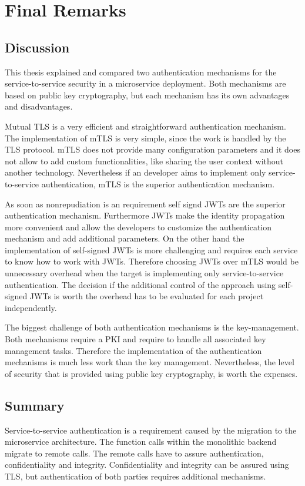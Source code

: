 \chapter{Final Remarks}
\label{cha:final_remarks}

\section{Discussion}
This thesis explained and compared two authentication mechanisms for the service-to-service security in a microservice deployment.
Both mechanisms are based on public key cryptography, but each mechanism has its own advantages and disadvantages.

Mutual TLS is a very efficient and straightforward authentication mechanism.
The implementation of mTLS is very simple, since the work is handled by the TLS protocol.
mTLS does not provide many configuration parameters and it does not allow to add custom functionalities, like sharing the user context without another technology.
Nevertheless if an developer aims to implement only service-to-service authentication, mTLS is the superior authentication mechanism.

As soon as nonrepudiation is an requirement self signd JWTs are the superior authentication mechanism.
Furthermore JWTs make the identity propagation more convenient and allow the developers to customize the authentication mechanism and add additional parameters.
On the other hand the implementation of self-signed JWTs is more challenging and requires each service to know how to work with JWTs.
Therefore choosing JWTs over mTLS would be unnecessary overhead when the target is implementing only service-to-service authentication.
The decision if the additional control of the approach using self-signed JWTs is worth the overhead has to be evaluated for each project independently.

The biggest challenge of both authentication mechanisms is the key-management.
Both mechanisms require a PKI and require to handle all associated key management tasks.
Therefore the implementation of the authentication mechanisms is much less work than the key management.
Nevertheless, the level of security that is provided using public key cryptography, is worth the expenses.

\section{Summary}
Service-to-service authentication is a requirement caused by the migration to the microservice architecture.
The function calls within the monolithic backend migrate to remote calls.
The remote calls have to assure authentication, confidentiality and integrity.
Confidentiality and integrity can be assured using TLS, but authentication of both parties requires additional mechanisms.

